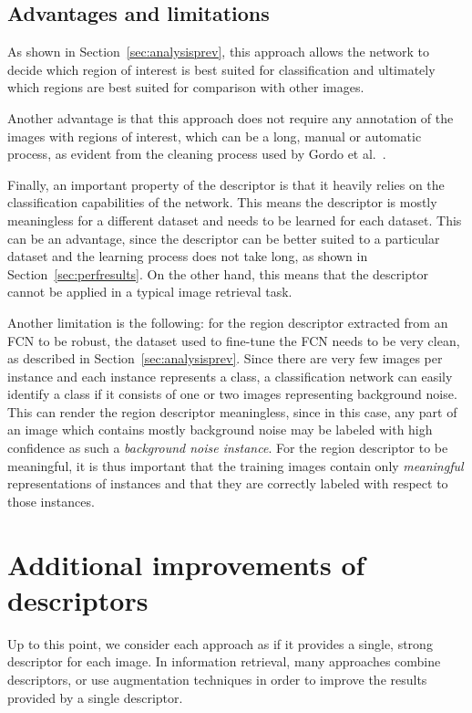 \subsection{Advantages and limitations}
As shown in Section~\ref{sec:analysisprev}, this approach
allows the network to decide which region of interest is
best suited for classification and ultimately which regions
are best suited for comparison with other images.

Another advantage is that this approach does not require
any annotation of the images with regions of interest,
which can be a long, manual or automatic process, as evident
from the cleaning process used by Gordo et al.~\cite{gordo_end--end_2017}.

Finally, an important property of the descriptor is that it
heavily relies on the classification
capabilities of the network. This means the descriptor is
mostly meaningless for a different dataset and needs
to be learned for each dataset. This can be an advantage,
since the descriptor can be better suited to a particular
dataset and the learning process does not take long, as shown
in Section~\ref{sec:perfresults}. On the other hand, this means that
the descriptor cannot be applied in a typical image retrieval
task.

Another limitation is the following: for the region descriptor extracted from
an FCN to be robust, the dataset used to fine-tune the FCN needs to be
very clean, as described in Section~\ref{sec:analysisprev}. Since there
are very few images per instance and each instance represents a class,
a classification network can easily identify a class if it consists
of one or two images representing background noise. This can render
the region descriptor meaningless, since in this case, any part of an image
which contains mostly background noise may be labeled with high confidence
as such a \emph{background noise instance}. For the region descriptor to be
meaningful, it is thus important that the training images contain only
\emph{meaningful} representations of instances and that they are
correctly labeled with respect to those instances.

\section{Additional improvements of descriptors}\label{sec:improvedesc}
Up to this point, we consider each approach
as if it provides a single, strong descriptor for each image.
In information retrieval, many approaches combine descriptors,
or use augmentation techniques in order to improve the results
provided by a single descriptor.

